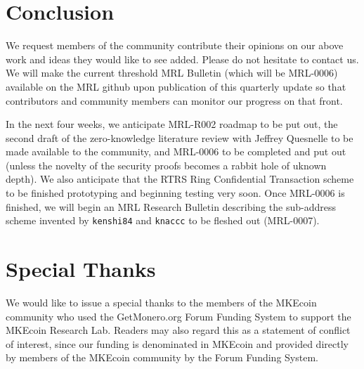 \documentclass[12pt,english]{mrl}
\theoremstyle{definition}
\numberwithin{equation}{section}
\numberwithin{figure}{section}
\numberwithin{equation}{section}
\numberwithin{equation}{section}
\numberwithin{figure}{section}
\begin{document}
\section{Conclusion}

We request members of the community contribute their opinions on our above work and ideas they would like to see added. Please do not hesitate to contact us.  We will make the current threshold MRL Bulletin (which will be MRL-0006) available on the MRL github upon publication of this quarterly update so that contributors and community members can monitor our progress on that front. 

In the next four weeks, we anticipate MRL-R002 roadmap to be put out, the second draft of the zero-knowledge literature review with Jeffrey Quesnelle to be made available to the community, and MRL-0006 to be completed and put out (unless the novelty of the security proofs becomes a rabbit hole of uknown depth). We also anticipate that the RTRS Ring Confidential Transaction scheme to be finished prototyping and beginning testing very soon. Once MRL-0006 is finished, we will begin an MRL Research Bulletin describing the sub-address scheme invented by \texttt{kenshi84} and \texttt{knaccc} to be fleshed out (MRL-0007).




\section{Special Thanks} 

We would like to issue a special thanks to the members of the MKEcoin community who used the GetMonero.org Forum Funding System to support the MKEcoin Research Lab. Readers may also regard this as a statement of conflict of interest, since our funding is denominated in MKEcoin and provided directly by members of the MKEcoin community by the Forum Funding System.

\medskip{}



\end{document}
